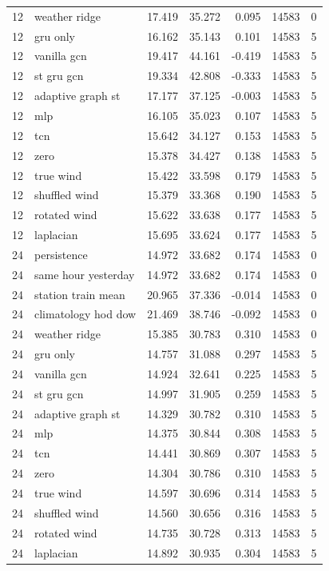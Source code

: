\begin{tabular}{llrrrrr}
12 & weather ridge & 17.419 & 35.272 & 0.095 & 14583 & 0 \\
12 & gru only & 16.162 & 35.143 & 0.101 & 14583 & 5 \\
12 & vanilla gcn & 19.417 & 44.161 & -0.419 & 14583 & 5 \\
12 & st gru gcn & 19.334 & 42.808 & -0.333 & 14583 & 5 \\
12 & adaptive graph st & 17.177 & 37.125 & -0.003 & 14583 & 5 \\
12 & mlp & 16.105 & 35.023 & 0.107 & 14583 & 5 \\
12 & tcn & 15.642 & 34.127 & 0.153 & 14583 & 5 \\
12 & zero & 15.378 & 34.427 & 0.138 & 14583 & 5 \\
12 & true wind & 15.422 & 33.598 & 0.179 & 14583 & 5 \\
12 & shuffled wind & 15.379 & 33.368 & 0.190 & 14583 & 5 \\
12 & rotated wind & 15.622 & 33.638 & 0.177 & 14583 & 5 \\
12 & laplacian & 15.695 & 33.624 & 0.177 & 14583 & 5 \\
24 & persistence & 14.972 & 33.682 & 0.174 & 14583 & 0 \\
24 & same hour yesterday & 14.972 & 33.682 & 0.174 & 14583 & 0 \\
24 & station train mean & 20.965 & 37.336 & -0.014 & 14583 & 0 \\
24 & climatology hod dow & 21.469 & 38.746 & -0.092 & 14583 & 0 \\
24 & weather ridge & 15.385 & 30.783 & 0.310 & 14583 & 0 \\
24 & gru only & 14.757 & 31.088 & 0.297 & 14583 & 5 \\
24 & vanilla gcn & 14.924 & 32.641 & 0.225 & 14583 & 5 \\
24 & st gru gcn & 14.997 & 31.905 & 0.259 & 14583 & 5 \\
24 & adaptive graph st & 14.329 & 30.782 & 0.310 & 14583 & 5 \\
24 & mlp & 14.375 & 30.844 & 0.308 & 14583 & 5 \\
24 & tcn & 14.441 & 30.869 & 0.307 & 14583 & 5 \\
24 & zero & 14.304 & 30.786 & 0.310 & 14583 & 5 \\
24 & true wind & 14.597 & 30.696 & 0.314 & 14583 & 5 \\
24 & shuffled wind & 14.560 & 30.656 & 0.316 & 14583 & 5 \\
24 & rotated wind & 14.735 & 30.728 & 0.313 & 14583 & 5 \\
24 & laplacian & 14.892 & 30.935 & 0.304 & 14583 & 5 \\
\hline\end{tabular}
